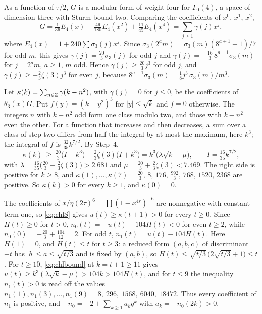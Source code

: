  As a function of $\tau/2$, $G$ is a modular form of weight four for $\Gamma_0(4)$, a space of dimension three with Sturm bound two. Comparing the coefficients of $x^0$, $x^1$, $x^2$,
\begin{equation}\label{eq:chlG}
G=\tfrac1{36}E_4(x)-\tfrac{49}{180}E_4(x^2)+\tfrac{11}{45}E_4(x^4)=\sum_{j\ge1}\gamma(j)x^j,
\end{equation}
where $E_4(x)=1+240\sum\sigma_3(j)x^j$. Since $\sigma_3(2^am)=\sigma_3(m)(8^{a+1}-1)/7$ for odd $m$, this gives $\gamma(j)=\tfrac{20}3\sigma_3(j)$ for odd $j$ and $\gamma(j)=-\tfrac{16}3\,8^{a-1}\sigma_3(m)$ for $j=2^am$, $a\ge1$, $m$ odd. Hence $\gamma(j)\ge\tfrac{20}3j^3$ for odd $j$, and $\gamma(j)\ge-\tfrac23\zeta(3)j^3$ for even $j$, because $8^{a-1}\sigma_3(m)=\tfrac18 j^3\,\sigma_3(m)/m^3$.

 Let $\kappa(k)=\sum_{n\in\mathbb{Z}}\gamma(k-n^2)$, with $\gamma(j)=0$ for $j\le0$, be the coefficients of $\theta_3(x)G$. Put $f(y)=(k-y^2)^3$ for $|y|\le\sqrt k$ and $f=0$ otherwise. The integers $n$ with $k-n^2$ odd form one class modulo two, and those with $k-n^2$ even the other. For a function that increases and then decreases, a sum over a class of step two differs from half the integral by at most the maximum, here $k^3$; the integral of $f$ is $\tfrac{32}{35}k^{7/2}$. By Step~4,
\begin{equation}\label{eq:chlbound}
\kappa(k)\ \ge\ \tfrac{20}3\big(I-k^3\big)-\tfrac23\zeta(3)\big(I+k^3\big)=k^3\big(\lambda\sqrt k-\mu\big),\qquad I=\tfrac{16}{35}k^{7/2},
\end{equation}
with $\lambda=\tfrac{16}{35}\big(\tfrac{20}3-\tfrac23\zeta(3)\big)>2.681$ and $\mu=\tfrac{20}3+\tfrac23\zeta(3)<7.469$. The right side is positive for $k\ge8$, and $\kappa(1),\dots,\kappa(7)=\tfrac{20}{3},\,8,\,176,\,\tfrac{992}{3},\,768,\,1520,\,2368$ are positive. So $\kappa(k)>0$ for every $k\ge1$, and $\kappa(0)=0$.

 The coefficients of $x/\eta(2\tau)^6=\prod(1-x^{4r})^{-6}$ are nonnegative with constant term one, so \eqref{eq:chlS} gives $u(t)\ge\kappa(t+1)>0$ for every $t\ge0$. Since $H(t)\ge0$ for $t>0$, $n_0(t)=-u(t)-104H(t)<0$ for even $t\ge2$, while $n_0(0)=-\tfrac{20}3+\tfrac{104}{12}=2$. For odd $t$, $n_1(t)=u(t)-104H(t)$. Here $H(1)=0$, and $H(t)\le t$ for $t\ge3$: a reduced form $(a,b,c)$ of discriminant $-t$ has $|b|\le a\le\sqrt{t/3}$ and is fixed by $(a,b)$, so $H(t)\le\sqrt{t/3}\,\big(2\sqrt{t/3}+1\big)\le t$. For $t\ge10$, \eqref{eq:chlbound} at $k=t+1\ge11$ gives $u(t)\ge k^3(\lambda\sqrt k-\mu)>104k>104H(t)$, and for $t\le9$ the inequality $n_1(t)>0$ is read off the values $n_1(1),n_1(3),\dots,n_1(9)=8,\ 296,\ 1568,\ 6040,\ 18472$. Thus every coefficient of $n_1$ is positive, and $-n_0=-2+\sum_{k\ge1}a_kq^k$ with $a_k=-n_0(2k)>0$.

